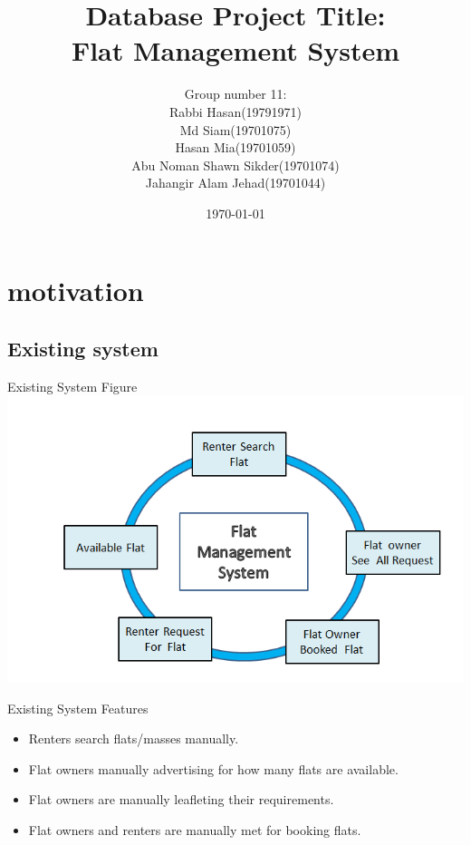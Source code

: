 \documentclass{beamer}
\title[Database Project Presentation]{Database Project Title:\\Flat Management System} %
\author{Group number 11: \newline  \\\scriptsize Rabbi Hasan(19791971)\\Md Siam(19701075)\\ Hasan Mia(19701059)\\Abu Noman Shawn Sikder(19701074)\\Jahangir Alam Jehad(19701044) } %
\institute[] %
{4th Semester\\
Department of Computer Science \& Engineering \\ University of Chittagong \\ %
\medskip
}
\date{\today} %
\begin{document}
\begin{frame}{  }
\titlepage  %
\end{frame}






\section{motivation} %
\subsection{Existing system} %

\begin{frame}[t] {Existing System Figure}
\includegraphics[height=6 cm ,width= 10 cm]{Screenshot (17).png}
\end{frame}
\begin{frame} {Existing System Features}
\begin{itemize}
\item Renters search flats/masses manually.
\item Flat owners manually advertising for how many flats are available.
\item Flat owners are manually leafleting their requirements.
\item  Flat owners and renters are manually met for booking flats.
\end{itemize}
\end{frame}
\end{document}
